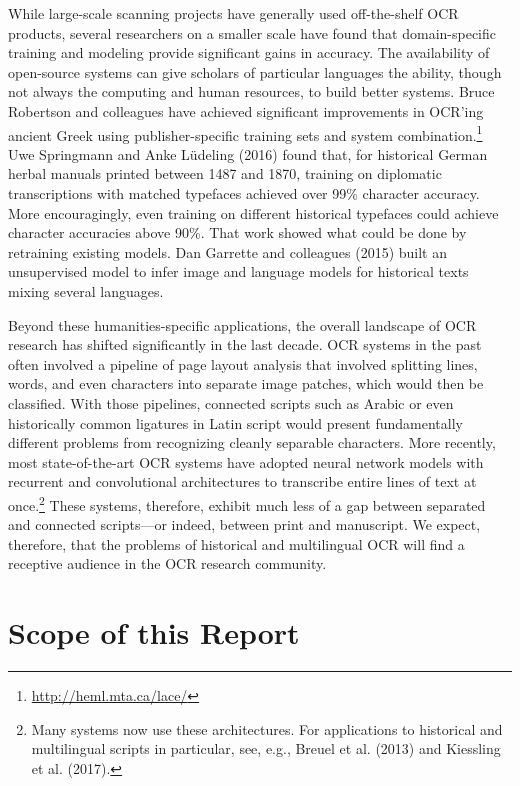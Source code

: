 \documentclass[twoside,11pt]{report}
\begin{document}
While large-scale scanning projects have generally used off-the-shelf OCR products, several researchers on a smaller scale have found that domain-specific training and modeling provide significant gains in accuracy. The availability of open-source systems can give  scholars of particular languages the ability, though not always the computing and human resources, to build better systems. Bruce Robertson and colleagues have achieved significant improvements in OCR'ing ancient Greek using publisher-specific training sets and system combination.\footnote{\url{http://heml.mta.ca/lace/}}  Uwe Springmann and Anke Lüdeling (2016) found that, for historical German herbal manuals printed between 1487 and 1870, training on diplomatic transcriptions with matched typefaces achieved over 99\% character accuracy. More encouragingly, even training on different historical typefaces could achieve character accuracies above 90\%. That work showed what could be done by retraining existing models. Dan Garrette and colleagues (2015) built an unsupervised model to infer image and language models for historical texts mixing several languages.

Beyond these humanities-specific applications, the overall landscape of OCR research has shifted significantly in the last decade. OCR systems in the past often involved a pipeline of page layout analysis that involved splitting lines, words, and even characters into separate image patches, which would then be classified. With those pipelines, connected scripts such as Arabic or even historically common ligatures in Latin script would present fundamentally different problems from recognizing cleanly separable characters. More recently, most state-of-the-art OCR systems have adopted neural network models with recurrent and convolutional architectures to transcribe entire lines of text at once.\footnote{Many systems now use these architectures. For applications to historical and multilingual scripts in particular, see, e.g., Breuel et al. (2013) and Kiessling et al. (2017).}  These systems, therefore, exhibit much less of a gap between separated and connected scripts---or indeed, between print and manuscript. We expect, therefore, that the problems of historical and multilingual OCR will find a receptive audience in the OCR research community.

\section{Scope of this Report}
\end{document}
